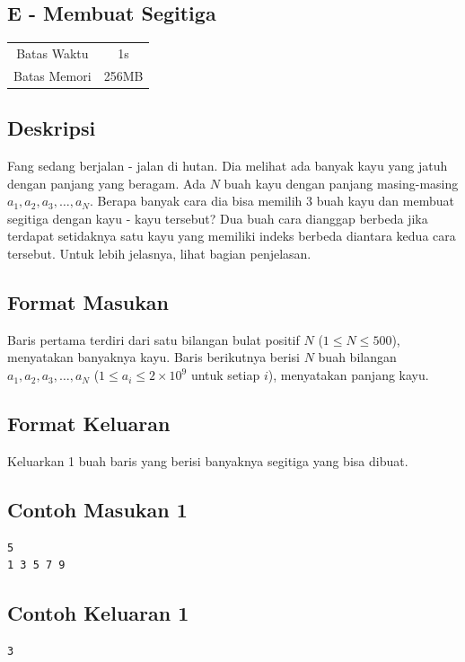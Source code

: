 \documentclass{article}
\begin{document}
\begin{center}
    \section*{E - Membuat Segitiga}

    \begin{tabular}{ | c c | }
        \hline
        Batas Waktu  & 1s \\    %
        Batas Memori & 256MB \\  %
        \hline
    \end{tabular}
\end{center}

\subsection*{Deskripsi}

Fang sedang berjalan - jalan di hutan. Dia melihat ada banyak kayu yang jatuh dengan panjang yang beragam. Ada $N$ buah kayu dengan panjang masing-masing $a_1, a_2, a_3, \dots, a_N$. Berapa banyak cara dia bisa memilih 3 buah kayu dan membuat segitiga dengan kayu - kayu tersebut? Dua buah cara dianggap berbeda jika terdapat setidaknya satu kayu yang memiliki indeks berbeda diantara kedua cara tersebut. Untuk lebih jelasnya, lihat bagian penjelasan.

\subsection*{Format Masukan}

Baris pertama terdiri dari satu bilangan bulat positif $N$ ($1 \leq N \leq 500$), menyatakan banyaknya kayu.
Baris berikutnya berisi $N$ buah bilangan $a_1, a_2, a_3, \dots, a_N$ ($1 \leq a_i \leq 2 \times 10^9$ untuk setiap $i$), menyatakan panjang kayu.

\subsection*{Format Keluaran}

Keluarkan 1 buah baris yang berisi banyaknya segitiga yang bisa dibuat.
\\

\begin{multicols}{2}
\subsection*{Contoh Masukan 1}
\begin{lstlisting}
5
1 3 5 7 9
\end{lstlisting}
\columnbreak
\subsection*{Contoh Keluaran 1}
\begin{lstlisting}
3
\end{lstlisting}
\vfill
\null
\end{multicols}
\end{document}

